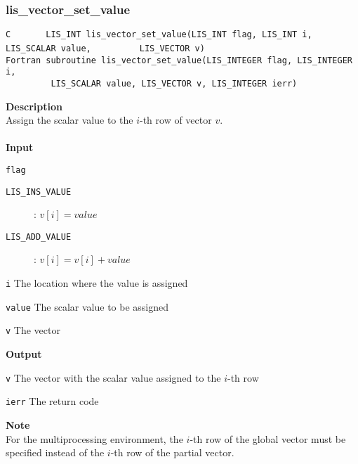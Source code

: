 \documentclass[a4paper]{article}
\newcommand{\namelistlabel}[1]{\mbox{#1}\hfill}
\newenvironment{namelist}[1]{%
\begin{list}{}
  {\let\makelabel\namelistlabel
  \settowidth{\labelwidth}{#1}
  \setlength{\leftmargin}{1.1\labelwidth}}
  }{%
\end{list}}
\begin{document}
\subsubsection{lis\_vector\_set\_value}
\begin{screen}
\verb|C       LIS_INT lis_vector_set_value(LIS_INT flag, LIS_INT i, LIS_SCALAR value,|
\verb|         LIS_VECTOR v)|\\
\verb|Fortran subroutine lis_vector_set_value(LIS_INTEGER flag, LIS_INTEGER i,|\\
\verb|         LIS_SCALAR value, LIS_VECTOR v, LIS_INTEGER ierr)|
\end{screen}
{\bf Description}\\
\indent
Assign the scalar value to the $i$-th row of vector $v$.
\\ \\
\noindent
{\bf Input}
\begin{namelist}{XXXXXXXXXXXXXXXXXXXX}
\item[\tt flag] \begin{description}
\item[\tt LIS\_INS\_VALUE]: $v[i] = value$
\item[\tt LIS\_ADD\_VALUE]: $v[i] = v[i] + value$
\end{description}
\item[\tt i] The location where the value is assigned
\item[\tt value] The scalar value to be assigned
\item[\tt v] The vector
\end{namelist}
{\bf Output}
\begin{namelist}{XXXXXXXXXXXXXXXXXXXX}
\item[\tt v] The vector with the scalar value assigned to the $i$-th row
\item[\tt ierr] The return code
\end{namelist}
{\bf Note}\\
\indent
For the multiprocessing environment, the $i$-th row of the global vector must be specified instead 
of the $i$-th row of the partial vector.
\end{document}
